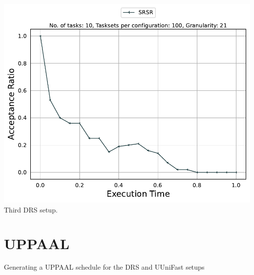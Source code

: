 \documentclass[]{article}
\begin{document}
\begin{minipage}[t]{0.48\linewidth}
            \includegraphics[width=\linewidth]{SRSR_3rd.pdf}
		Third DRS setup.
		\vspace{0.3cm}         

	\end{minipage}

	\clearpage
	\section{UPPAAL}
{
\raggedleft Generating a UPPAAL schedule for the DRS and UUniFast setups \newline
}
\end{document}
